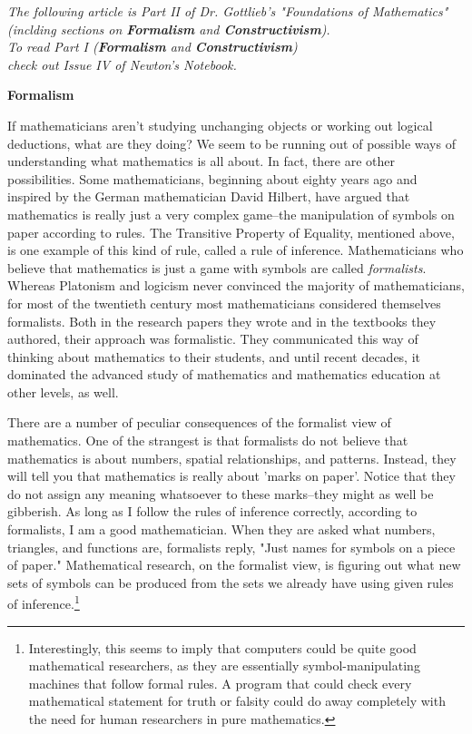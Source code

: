 
\begin{center}
	\textit{The following article is Part II of Dr. Gottlieb's "Foundations of Mathematics"\\ 
	(inclding sections on \textbf{Formalism} and \textbf{Constructivism}).\\
	To read Part I (\textbf{Formalism} and \textbf{Constructivism})\\
	check out Issue IV of Newton's Notebook.}
\end{center}


\noindent
\textbf{Formalism}

    If mathematicians aren't studying unchanging objects or working out logical deductions, what are they doing?  We seem to be running out of possible ways of understanding what mathematics is all about.  In fact, there are other possibilities.  Some mathematicians, beginning about eighty years ago and inspired by the German mathematician David Hilbert, have argued that mathematics is really just a very complex game--the manipulation of symbols on paper according to rules.  The Transitive Property of Equality, mentioned above, is one example of this kind of rule, called a rule of inference.  Mathematicians who believe that mathematics is just a game with symbols are called \emph{formalists}.  Whereas Platonism and logicism never convinced the majority of mathematicians, for most of the twentieth century most mathematicians considered themselves formalists.  Both in the research papers they wrote and in the textbooks they authored, their approach was formalistic.  They communicated this way of thinking about mathematics to their students, and until recent decades, it dominated the advanced study of mathematics and mathematics education at other levels, as well.
     
     There are a number of peculiar consequences of the formalist view of mathematics.  One of the strangest is that formalists do not believe that mathematics is about numbers, spatial relationships, and patterns.  Instead, they will tell you that mathematics is really about 'marks on paper'.  Notice that they do not assign any meaning whatsoever to these marks--they might as well be gibberish.  As long as I follow the rules of inference correctly, according to formalists, I am a good mathematician.  When they are asked what numbers, triangles, and functions are, formalists reply, "Just names for symbols on a piece of paper."   Mathematical research, on the formalist view, is figuring out what new sets of symbols can be produced from the sets we already have using given rules of inference.\footnote{Interestingly, this seems to imply that computers could be quite good mathematical researchers, as they are essentially symbol-manipulating machines that follow formal rules.  A program that could check every mathematical statement for truth or falsity could do away completely with the need for human researchers in pure mathematics.}
     
